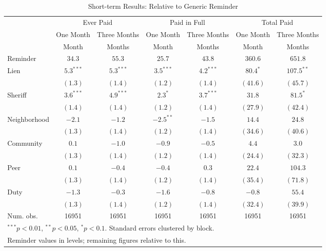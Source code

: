 \documentclass[12pt]{article}
\begin{document}
\begin{table}[htbp]
\caption{Short-term Results: Relative to Generic Reminder}
\begin{center}
\begin{tabular}{l c c c c c c }
\hline
 & \multicolumn{2}{c}{Ever Paid} & \multicolumn{2}{c}{Paid in Full} & \multicolumn{2}{c}{Total Paid} \\
 & One Month & Three Months & One Month & Three Months & One Month & Three Months \\
 & Month & Months & Month & Months & Month & Months \\
\hline
Reminder     & $34.3$ & $55.3$ & $25.7$ & $43.8$ & $360.6$ & $651.8$ \\
\hline
Lien         & $5.3^{***}$  & $5.3^{***}$  & $3.5^{***}$  & $4.2^{***}$  & $80.4^{*}$    & $107.5^{**}$  \\
             & $(1.3)$      & $(1.4)$      & $(1.2)$      & $(1.4)$      & $(41.6)$      & $(45.7)$      \\
Sheriff      & $3.6^{***}$  & $4.9^{***}$  & $2.3^{*}$    & $3.7^{***}$  & $31.8$        & $81.5^{*}$    \\
             & $(1.4)$      & $(1.4)$      & $(1.2)$      & $(1.4)$      & $(27.9)$      & $(42.4)$      \\
Neighborhood & $-2.1$       & $-1.2$       & $-2.5^{**}$  & $-1.5$       & $14.4$        & $24.8$        \\
             & $(1.3)$      & $(1.4)$      & $(1.2)$      & $(1.4)$      & $(34.6)$      & $(40.6)$      \\
Community    & $0.1$        & $-1.0$       & $-0.9$       & $-0.5$       & $4.4$         & $3.0$         \\
             & $(1.3)$      & $(1.4)$      & $(1.2)$      & $(1.4)$      & $(24.4)$      & $(32.3)$      \\
Peer         & $0.1$        & $-0.4$       & $-0.4$       & $0.3$        & $22.4$        & $104.3$       \\
             & $(1.3)$      & $(1.4)$      & $(1.2)$      & $(1.4)$      & $(35.4)$      & $(71.8)$      \\
Duty         & $-1.3$       & $-0.3$       & $-1.6$       & $-0.8$       & $-0.8$        & $55.4$        \\
             & $(1.3)$      & $(1.4)$      & $(1.2)$      & $(1.4)$      & $(32.4)$      & $(39.9)$      \\
\hline
Num. obs.    & 16951        & 16951        & 16951        & 16951        & 16951         & 16951         \\
\hline
\multicolumn{7}{l}{\scriptsize{$^{***}p<0.01$, $^{**}p<0.05$, $^*p<0.1$. Standard errors clustered by block.}} \\
\multicolumn{7}{l}{\scriptsize{Reminder values in levels; remaining figures relative to this.}}
\end{tabular}
\label{sh_lpm_rob}
\end{center}
\end{table}
\end{document}
